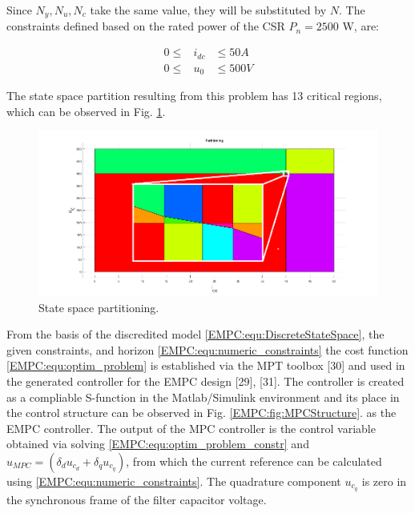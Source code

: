     Since $N_y,N_u,N_c$ take the same value, they will be substituted by $N$.
    The constraints defined based on the rated power of the CSR $P_n=2500$ W, are:

    \begin{equation}
        \begin{array}{rcl}
            0\leq&i_{dc}&\leq 50A\\
            0\leq&u_{0}&\leq 500V
        \end{array}
        \label{EMPC:equ:numeric_constraints}
    \end{equation}

    The state space partition resulting from this problem has 13 critical regions, which can be observed in Fig. \ref{EMPC:fig:regions}.

    \begin{figure}[!ht]
        \centering
        \includegraphics[width=\textwidth]{EMPC_PNG_Pics/Regions.png}
        \caption{State space partitioning.}
        \label{EMPC:fig:regions}
    \end{figure}

    From the basis of the discredited model \ref{EMPC:equ:DiscreteStateSpace}, the given constraints, and horizon \ref{EMPC:equ:numeric_constraints} the cost function \ref{EMPC:equ:optim_problem} is established via the MPT toolbox [30] and used in the generated controller for the EMPC design [29], [31]. The controller is created as a compliable S-function in the Matlab/Simulink environment and its place in the control structure can be observed in Fig. \ref{EMPC:fig:MPCStructure}. as the EMPC controller.
    The output of the MPC controller is the control variable obtained via solving \ref{EMPC:equ:optim_problem_constr} and
    $u_{MPC}=(\delta_du_{c_d}+\delta_qu_{c_q})$, from which the current reference can be calculated using \ref{EMPC:equ:numeric_constraints}. The quadrature component $u_{c_q}$ is zero in the synchronous frame of the filter capacitor voltage.


